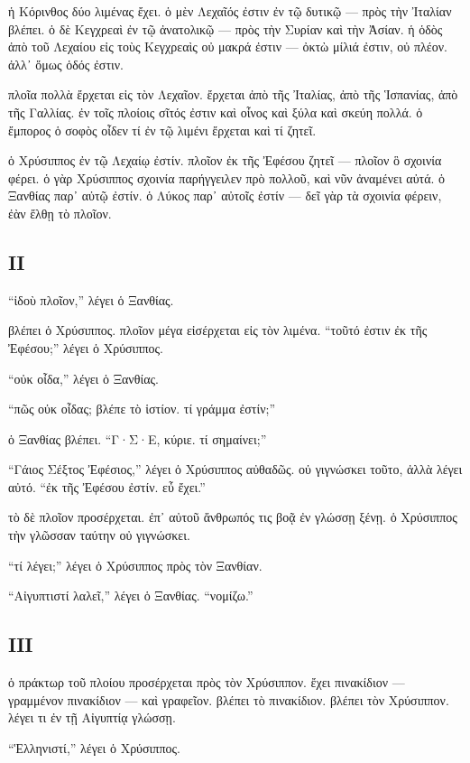 \documentclass[a4paper]{report}
\begin{document}
ἡ Κόρινθος δύο λιμένας ἔχει. ὁ μὲν Λεχαῖός ἐστιν ἐν τῷ δυτικῷ --- πρὸς
τὴν Ἰταλίαν βλέπει. ὁ δὲ Κεγχρεαὶ ἐν τῷ ἀνατολικῷ --- πρὸς τὴν Συρίαν
καὶ τὴν Ἀσίαν. ἡ ὁδὸς ἀπὸ τοῦ Λεχαίου εἰς τοὺς Κεγχρεαὶς οὐ μακρά ἐστιν
--- ὀκτὼ μίλιά ἐστιν, οὐ πλέον. ἀλλ᾿ ὅμως ὁδός ἐστιν.

πλοῖα πολλὰ ἔρχεται εἰς τὸν Λεχαῖον. ἔρχεται ἀπὸ τῆς Ἰταλίας, ἀπὸ τῆς
Ἱσπανίας, ἀπὸ τῆς Γαλλίας. ἐν τοῖς πλοίοις σῖτός ἐστιν καὶ οἶνος καὶ
ξύλα καὶ σκεύη πολλά. ὁ ἔμπορος ὁ σοφὸς οἶδεν τί ἐν τῷ λιμένι ἔρχεται
καὶ τί ζητεῖ.

ὁ Χρύσιππος ἐν τῷ Λεχαίῳ ἐστίν. πλοῖον ἐκ τῆς Ἐφέσου ζητεῖ --- πλοῖον ὃ
σχοινία φέρει. ὁ γὰρ Χρύσιππος σχοινία παρήγγειλεν πρὸ πολλοῦ, καὶ νῦν
ἀναμένει αὐτά. ὁ Ξανθίας παρ᾿ αὐτῷ ἐστίν. ὁ Λύκος παρ᾿ αὐτοῖς ἐστίν ---
δεῖ γὰρ τὰ σχοινία φέρειν, ἐὰν ἔλθῃ τὸ πλοῖον.

\subsection{ΙΙ}\label{ux3b9ux3b9-3}

``ἰδοὺ πλοῖον,'' λέγει ὁ Ξανθίας.

βλέπει ὁ Χρύσιππος. πλοῖον μέγα εἰσέρχεται εἰς τὸν λιμένα. ``τοῦτό ἐστιν
ἐκ τῆς Ἐφέσου;'' λέγει ὁ Χρύσιππος.

``οὐκ οἶδα,'' λέγει ὁ Ξανθίας.

``πῶς οὐκ οἶδας; βλέπε τὸ ἱστίον. τί γράμμα ἐστίν;''

ὁ Ξανθίας βλέπει. ``Γ·Σ·Ε, κύριε. τί σημαίνει;''

``Γάιος Σέξτος Ἐφέσιος,'' λέγει ὁ Χρύσιππος αὐθαδῶς. οὐ γιγνώσκει τοῦτο,
ἀλλὰ λέγει αὐτό. ``ἐκ τῆς Ἐφέσου ἐστίν. εὖ ἔχει.''

τὸ δὲ πλοῖον προσέρχεται. ἐπ᾿ αὐτοῦ ἄνθρωπός τις βοᾷ ἐν γλώσσῃ ξένῃ. ὁ
Χρύσιππος τὴν γλῶσσαν ταύτην οὐ γιγνώσκει.

``τί λέγει;'' λέγει ὁ Χρύσιππος πρὸς τὸν Ξανθίαν.

``Αἰγυπτιστί λαλεῖ,'' λέγει ὁ Ξανθίας. ``νομίζω.''

\subsection{ΙΙΙ}\label{ux3b9ux3b9ux3b9-3}

ὁ πράκτωρ τοῦ πλοίου προσέρχεται πρὸς τὸν Χρύσιππον. ἔχει πινακίδιον ---
γραμμένον πινακίδιον --- καὶ γραφεῖον. βλέπει τὸ πινακίδιον. βλέπει τὸν
Χρύσιππον. λέγει τι ἐν τῇ Αἰγυπτίᾳ γλώσσῃ.

``Ἑλληνιστί,'' λέγει ὁ Χρύσιππος.
\end{document}
